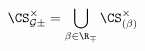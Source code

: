 \begin{equation}
\CS^\times_{{\cal G}\pm} = \bigcup_{\beta\in\R_\mp} \CS^\times_{(\beta
)}
\label{eq:bdual-2}
\end{equation}

